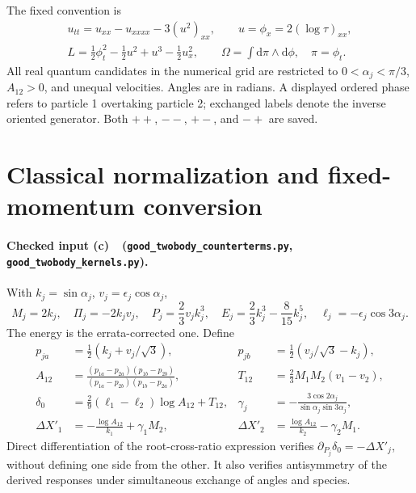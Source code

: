 \documentclass[11pt,a4paper]{article}
\newcommand{\Cc}{\textbf{(c)}\ }
\newcommand{\dd}{\mathrm d}
\newcommand{\file}[1]{\nolinkurl{#1}}
\newcommand{\kernels}{\file{good_twobody_kernels.py}}
\newcommand{\ct}{\file{good_twobody_counterterms.py}}
\begin{document}
The fixed convention is
\begin{gather*}
 u_{tt}=u_{xx}-u_{xxxx}-3(u^2)_{xx},\qquad u=\phi_x=2(\log\tau)_{xx},\\
 L=\tfrac12\phi_t^2-\tfrac12u^2+u^3-\tfrac12u_x^2,\qquad
 \Omega=\int\dd\pi\wedge\dd\phi,\quad \pi=\phi_t.
\end{gather*}
All real quantum candidates in the numerical grid are restricted to
\(0<\alpha_j<\pi/3\), \(A_{12}>0\), and unequal velocities.
Angles are in radians. A displayed ordered phase refers to particle 1
overtaking particle 2; exchanged labels denote the inverse oriented
generator. Both \(++\), \(--\), \(+-\), and \(-+\) are saved.

\section{Classical normalization and fixed-momentum conversion}
\paragraph{Checked input \Cc\ (\ct, \kernels).}
With \(k_j=\sin\alpha_j\), \(v_j=\epsilon_j\cos\alpha_j\),
\[
 M_j=2k_j,\quad \Pi_j=-2k_jv_j,\quad P_j=\frac23v_jk_j^3,
 \quad E_j=\frac23k_j^3-\frac8{15}k_j^5,\quad
 \ell_j=-\epsilon_j\cos3\alpha_j.
\]
The energy is the errata-corrected one. Define
\begin{align}
 p_{ja}&=\tfrac12(k_j+v_j/\sqrt3),&
 p_{jb}&=\tfrac12(v_j/\sqrt3-k_j),\\
 A_{12}&=\frac{(p_{1a}-p_{2a})(p_{1b}-p_{2b})}
 {(p_{1a}-p_{2b})(p_{1b}-p_{2a})},&
 T_{12}&=\frac23M_1M_2(v_1-v_2),\\
 \delta_0&=\frac29(\ell_1-\ell_2)\log A_{12}+T_{12},&
 \gamma_j&=-\frac{3\cos2\alpha_j}{\sin\alpha_j\sin3\alpha_j},\\
 \Delta X'_1&=-\frac{\log A_{12}}{k_1}+\gamma_1M_2,&
 \Delta X'_2&=\frac{\log A_{12}}{k_2}-\gamma_2M_1.
 \label{eq:shifts}
\end{align}
Direct differentiation of the root-cross-ratio expression verifies
\(\partial_{P_j}\delta_0=-\Delta X'_j\), without defining one side
from the other. It also verifies antisymmetry of the derived responses
under simultaneous exchange of angles and species.
\end{document}
